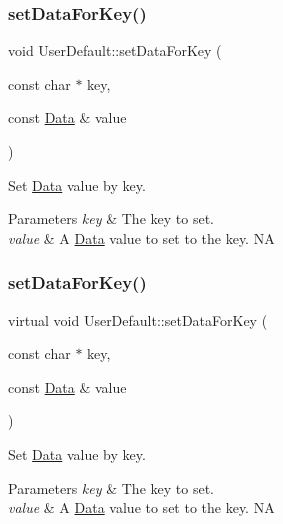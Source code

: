 \subsubsection{\texorpdfstring{set\+Data\+For\+Key()}{setDataForKey()}\hspace{0.1cm}{\footnotesize\ttfamily [1/2]}}
{\footnotesize\ttfamily void User\+Default\+::set\+Data\+For\+Key (\begin{DoxyParamCaption}\item[{const char $\ast$}]{key,  }\item[{const \hyperlink{classData}{Data} \&}]{value }\end{DoxyParamCaption})\hspace{0.3cm}{\ttfamily [virtual]}}

Set \hyperlink{classData}{Data} value by key. 
\begin{DoxyParams}{Parameters}
{\em key} & The key to set. \\
\hline
{\em value} & A \hyperlink{classData}{Data} value to set to the key.  NA \\
\hline
\end{DoxyParams}
\mbox{\label{classUserDefault_a3635db62c1a64343eea3d9429a6ee061}} 
\subsubsection{\texorpdfstring{set\+Data\+For\+Key()}{setDataForKey()}\hspace{0.1cm}{\footnotesize\ttfamily [2/2]}}
{\footnotesize\ttfamily virtual void User\+Default\+::set\+Data\+For\+Key (\begin{DoxyParamCaption}\item[{const char $\ast$}]{key,  }\item[{const \hyperlink{classData}{Data} \&}]{value }\end{DoxyParamCaption})\hspace{0.3cm}{\ttfamily [virtual]}}

Set \hyperlink{classData}{Data} value by key. 
\begin{DoxyParams}{Parameters}
{\em key} & The key to set. \\
\hline
{\em value} & A \hyperlink{classData}{Data} value to set to the key.  NA \\
\hline
\end{DoxyParams}
\mbox{\label{classUserDefault_ae93fe9a602d0166fb70cbcc6d2ffbafd}} 
